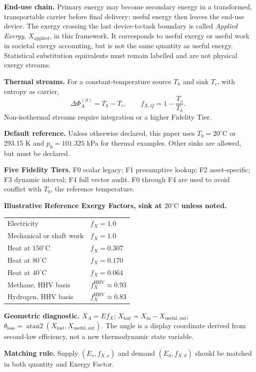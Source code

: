 \documentclass[11pt]{article}
\newcommand{\fx}{f_X}
\newcommand{\XA}{X_A}
\newcommand{\Xap}{X_{\mathrm{applied}}}
\newcommand{\thetaloss}{\theta_{\mathrm{loss}}}
\newcommand{\degC}{^{\circ}\mathrm{C}}
\begin{document}
\begin{tcolorbox}[colback=white,colframe=black,arc=1.2mm,boxrule=0.8pt,left=8pt,right=8pt,top=6pt,bottom=6pt]
\textbf{End-use chain.} Primary energy may become secondary energy in a transformed, transportable carrier before final delivery; useful energy then leaves the end-use device. The exergy crossing the last device-to-task boundary is called \emph{Applied Exergy}, $\Xap$, in this framework. It corresponds to useful exergy or useful work in societal exergy accounting, but is not the same quantity as useful energy. Statistical substitution equivalents must remain labelled and are not physical exergy streams.

\textbf{Thermal streams.} For a constant-temperature source $T_h$ and sink $T_c$, with entropy as carrier,
\begin{equation*}
\Delta\Phi_A^{(S)} = T_h-T_c,\qquad f_{X,Q} = 1-\frac{T_c}{T_h}.
\end{equation*}
Non-isothermal streams require integration or a higher Fidelity Tier.

\textbf{Default reference.} Unless otherwise declared, this paper uses $T_0=20\degC$ or 293.15 K and $p_0=101.325$ kPa for thermal examples. Other sinks are allowed, but must be declared.

\textbf{Five Fidelity Tiers.} F0 scalar legacy; F1 presumptive lookup; F2 asset-specific; F3 dynamic interval; F4 full vector audit. F0 through F4 are used to avoid conflict with $T_0$, the reference temperature.

\textbf{Illustrative Reference Exergy Factors, sink at $20\degC$ unless noted.}
\begin{center}
\begin{tabularx}{0.88\linewidth}{@{}lX@{}}
\toprule
Electricity & $\fx = 1.0$ \\
Mechanical or shaft work & $\fx = 1.0$ \\
Heat at $150\degC$ & $\fx = 0.307$ \\
Heat at $80\degC$ & $\fx = 0.170$ \\
Heat at $40\degC$ & $\fx = 0.064$ \\
Methane, HHV basis & $\fx^{\mathrm{HHV}} \approx 0.93$ \\
Hydrogen, HHV basis & $\fx^{\mathrm{HHV}} \approx 0.83$ \\
\bottomrule
\end{tabularx}
\end{center}

\textbf{Geometric diagnostic.} $\XA=E\fx$; $X_{\mathrm{lost}}=X_{\mathrm{in}}-X_{\mathrm{useful,out}}$; $\thetaloss=\operatorname{atan2}(X_{\mathrm{lost}},X_{\mathrm{useful,out}})$. The angle is a display coordinate derived from second-law efficiency, not a new thermodynamic state variable.

\textbf{Matching rule.} Supply $(E_s,f_{X,s})$ and demand $(E_d,f_{X,d})$ should be matched in both quantity and Exergy Factor.
\end{tcolorbox}
\newpage
\fi
\end{document}
